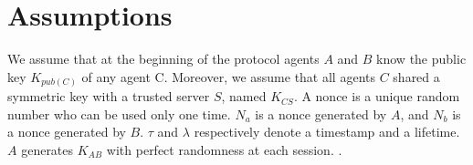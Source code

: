 \section{Assumptions}


We assume that at the beginning of the protocol agents $A$ and $B$ know the public key $K_{pub(C)}$ of any agent C.
Moreover, we assume that all agents $C$ shared a symmetric key with a trusted server $S$, named $K_{CS}$. A nonce is a unique random number who can be used only one time. $N_a$
is a nonce generated by $A$, and $N_b$ is a nonce generated by $B$. $\tau$ and $\lambda$ respectively denote a timestamp
and a lifetime. $A$ generates $K_{AB}$ with perfect randomness at each session.
.
